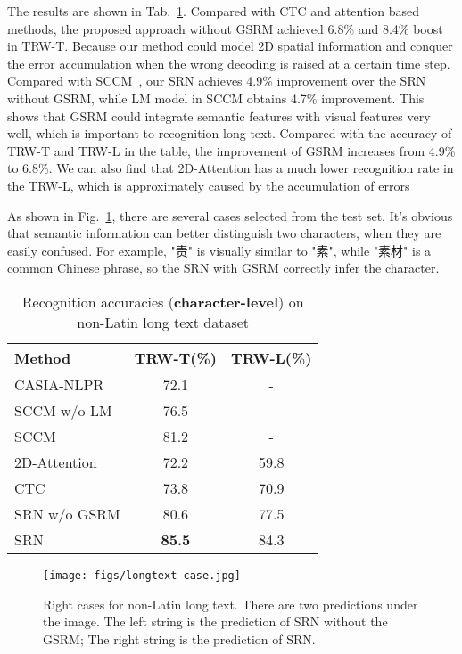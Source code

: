 \documentclass[10pt,twocolumn,letterpaper]{article}
\begin{document}
\begin{CJK}{UTF8}{gbsn}
The results are shown in Tab.~\ref{tab:longtext}. Compared with CTC and attention based methods, the proposed approach without GSRM achieved 6.8\% and 8.4\% boost in TRW-T. Because our method could model 2D spatial information and conquer the error accumulation when the wrong decoding is raised at a certain time step. Compared with SCCM~\cite{yin2017scene}, our SRN achieves 4.9\% improvement over the SRN without GSRM, while LM model in SCCM obtains 4.7\% improvement. This shows that GSRM could integrate semantic features with visual features very well, which is important to recognition long text. Compared with the accuracy of TRW-T and TRW-L in the table, the improvement of GSRM increases from 4.9\% to 6.8\%. We can also find that 2D-Attention has a much lower recognition rate in the TRW-L, which is approximately caused by the accumulation of errors 

As shown in Fig.~\ref{fig:right_case_longtext}, there are several cases selected from the test set. It's obvious that semantic information can better distinguish two characters, when they are easily confused. For example, "责" is visually similar to "素", while "素材" is a common Chinese phrase, so the SRN with GSRM correctly infer the character.

\begin{table}[htp]\footnotesize
  \begin{center}
  \caption{Recognition accuracies (\textbf{character-level}) on non-Latin long text dataset}
  \label{tab:longtext}
\begin{tabular}{|l|c|c|}
  \hline
  Method &TRW-T(\%) & TRW-L(\%)\\
  \hline
  CASIA-NLPR\cite{zhou2015icdar}& 72.1 &-\\
  SCCM w/o LM\cite{yin2017scene}& 76.5 &-\\
  SCCM\cite{yin2017scene}& 81.2 &-\\
   
  2D-Attention& 72.2 &59.8\\
  CTC& 73.8 & 70.9\\
  \hline
  SRN w/o GSRM& 80.6 & 77.5\\
  SRN& \textbf{85.5} & 84.3\\
  \hline
  \end{tabular}
  \end{center}
\vspace{-6mm}
\end{table}

\begin{figure}
    \centering
    \texttt{[image: figs/longtext-case.jpg]}
    \caption{Right cases for non-Latin long text. There are two predictions under the image. 
    The left string is the prediction of SRN without the GSRM; 
    The right string is the prediction of SRN.}
    \label{fig:right_case_longtext}
    \vspace{-1mm}
\end{figure}


\end{CJK}
\end{document}
